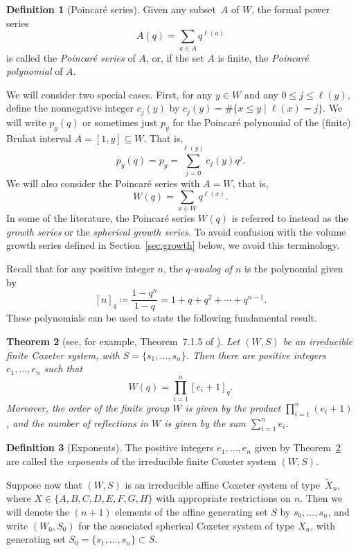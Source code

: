 \documentclass[11pt]{amsart}
\theoremstyle{plain}
\newtheorem{thm}{Theorem}[section]
\theoremstyle{definition}
\newtheorem{definition}[thm]{Definition}
\numberwithin{equation}{subsection}
\begin{document}
\begin{definition}[Poincar\'e series] 
Given any subset~$A$ of $W$, the formal power series 
\[
A(q) = \sum_{a \in A} q^{\ell(a)}
\]
is called the \emph{Poincar\'e series} of $A$, or, if the set $A$ is finite, the \emph{Poincar\'e polynomial} of $A$. 
\end{definition}

We will consider two special cases. 
First, for any $y \in W$ and any $0 \leq j \leq \ell(y)$, define the nonnegative integer $c_j(y)$ by
$
c_j(y) =  \#\{ x \leq y \mid \ell(x) = j \}.
$
We will write $p_y(q)$ or sometimes just $p_y$ for the Poincar\'e polynomial of the (finite) Bruhat interval $A = [1,y] \subseteq W$. That is,	
\[
	p_y(q) = p_y = \sum_{j=0}^{\ell(y)} c_j(y) q^j.
\]	
We will also consider the Poincar\'e series with $A = W$, that is,
\[
W(q) = \sum_{x \in W} q^{\ell(x)}.
\]
In some of the literature, the Poincar\'e series $W(q)$ is referred to instead as the \emph{growth series} or the \emph{spherical growth series}. To avoid confusion with the volume growth series defined in Section~\ref{sec:growth} below, we avoid this terminology.

Recall that for any positive integer $n$, the \emph{$q$-analog of $n$} is the polynomial given by
\[
  [n]_q \coloneqq \frac{1-q^n}{1-q} = 1 + q + q^2 + \cdots + q^{n-1}.
\]
These polynomials can be used to state the following fundamental result. 

\begin{thm}[see, for example, Theorem~7.1.5 of \cite{BjoernerBrenti}]\label{thm:exponents} Let $(W,S)$ be an irreducible finite Coxeter system, with $S = \{ s_1, \dots, s_n \}$.  Then there are positive integers $e_1, \dots, e_n$ such that 
\[
  W(q) = \prod_{i=1}^n [e_i + 1]_q.
\]
Moreover, 
the order of the finite group $W$ is given by the product $\prod_{i=1}^n (e_i + 1)$, and the number of reflections in $W$ is given by the sum $\sum_{i=1}^n e_i$.
\end{thm}



\begin{definition}[Exponents]\label{defn:exponents} The positive integers $e_1,\dots,e_n$ given by Theorem~\ref{thm:exponents} are called the \emph{exponents} of the irreducible finite Coxeter system $(W,S)$. 
\end{definition}

Suppose now that $(W,S)$ is an irreducible affine Coxeter system of type~$\tilde{X}_n$, where $X \in \{A, B, C, D, E, F, G, H \}$ with appropriate restrictions on $n$. Then we will denote the $(n+1)$ elements of the affine generating set $S$ by $s_0,\dots,s_n$, and write $(W_0,S_0)$ for the associated spherical Coxeter system of type $X_n$, with generating set $S_0 = \{ s_1,\dots, s_n \} \subset S$.
\end{document}
